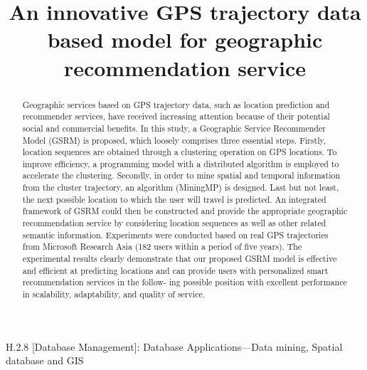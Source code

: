 \documentclass[conference]{IEEEtran}
\begin{document}
\title{An innovative GPS trajectory data based model for geographic recommendation service}


\author{
}






\maketitle

\begin{abstract}
Geographic services based on GPS trajectory data, such as location prediction and recommender services, have received increasing attention because of their potential social and commercial benefits. In this study, a Geographic Service Recommender Model (GSRM) is proposed, which loosely comprises three essential steps. Firstly, location sequences are obtained through a clustering operation on GPS locations. To improve efficiency, a programming model with a distributed algorithm is employed to accelerate the clustering. Secondly, in order to mine spatial and temporal information from the cluster trajectory, an algorithm (MiningMP) is designed. Last but not least, the next possible location to which the user will travel is predicted. An integrated framework of GSRM could then be constructed and provide the appropriate geographic recommendation service by considering location sequences as well as other related semantic information. Experiments were conducted based on real GPS trajectories from Microsoft Research Asia (182 users within a period of five years). The experimental results clearly demonstrate that our proposed GSRM model is effective and efficient at predicting locations and can provide users with personalized smart recommendation services in the follow- ing possible position with excellent performance in scalability, adaptability, and quality of service.\end{abstract}

\renewcommand\IEEEkeywordsname{Categories and Subject Descriptors}
\begin{IEEEkeywords}
H.2.8 [Database Management]: Database Applications—Data
mining, Spatial database and GIS
\end{IEEEkeywords}
\end{document}
